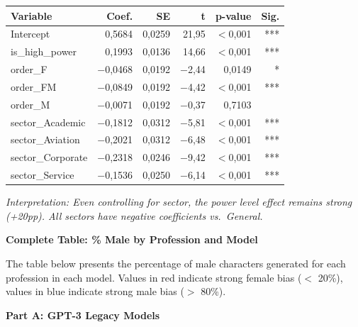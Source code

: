 \documentclass[12pt,a4paper]{article}
\begin{document}
\begin{table}[H]
\centering
\begin{tabular}{lrrrrr}
\toprule
\textbf{Variable} & \textbf{Coef.} & \textbf{SE} & \textbf{t} & \textbf{p-value} & \textbf{Sig.} \\
\midrule
Intercept & 0,5684 & 0,0259 & 21,95 & $<$0,001 & *** \\
is\_high\_power & 0,1993 & 0,0136 & 14,66 & $<$0,001 & *** \\
order\_F & $-$0,0468 & 0,0192 & $-$2,44 & 0,0149 & * \\
order\_FM & $-$0,0849 & 0,0192 & $-$4,42 & $<$0,001 & *** \\
order\_M & $-$0,0071 & 0,0192 & $-$0,37 & 0,7103 & \\
sector\_Academic & $-$0,1812 & 0,0312 & $-$5,81 & $<$0,001 & *** \\
sector\_Aviation & $-$0,2021 & 0,0312 & $-$6,48 & $<$0,001 & *** \\
sector\_Corporate & $-$0,2318 & 0,0246 & $-$9,42 & $<$0,001 & *** \\
sector\_Service & $-$0,1536 & 0,0250 & $-$6,14 & $<$0,001 & *** \\
\bottomrule
\end{tabular}
\end{table}

\noindent\textit{Interpretation: Even controlling for sector, the power level effect
remains strong (+20pp). All sectors have negative coefficients vs.\
General.}

\vspace{0.5cm}
\noindent\textbf{Complete Table: \% Male by Profession and Model}

The table below presents the percentage of male characters
generated for each profession in each model. Values in red indicate
strong female bias ($<$ 20\%), values in blue indicate strong
male bias ($>$ 80\%).

\vspace{0.5cm}
\newpage
\noindent\textbf{Part A: GPT-3 Legacy Models}
\end{document}
